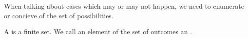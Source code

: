 

When talking about cases which
may or may not happen, we need
to enumerate or concieve of the
set of possibilities.


A 
is a finite set.
We call an element of the
set of outcomes an .
